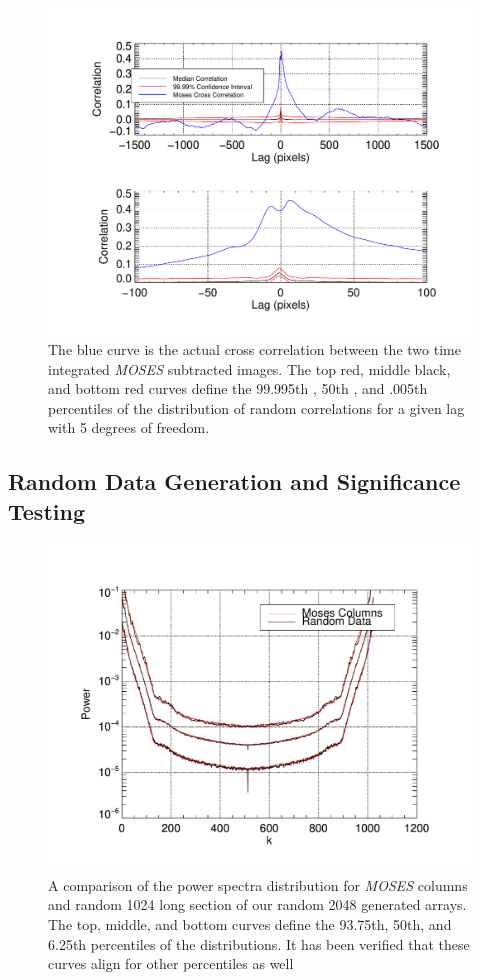 \documentclass[]{aastex6}
\begin{document}
\begin{figure}[t]
\centering
\includegraphics[scale=.5]{images/sigtest_5.pdf}
\caption{The blue curve is the actual cross correlation between the two time integrated \textit{MOSES} subtracted images.  The top red, middle black, and bottom red curves define the 99.995th , 50th , and .005th percentiles of the distribution of random correlations for a given lag with 5 degrees of freedom.}
\end{figure}	


\subsection{Random Data Generation and Significance Testing}

\begin{figure}[t]
\centering
\includegraphics[scale=.5]{images/sigtestpower.pdf}
\caption{A comparison of the power spectra distribution for \textit{MOSES} columns and random 1024 long section of our random 2048 generated arrays.  The top, middle, and bottom curves define the 93.75th, 50th, and 6.25th percentiles of the distributions.  It has been verified that these curves align for other percentiles as well}
\end{figure}	
\end{document}
